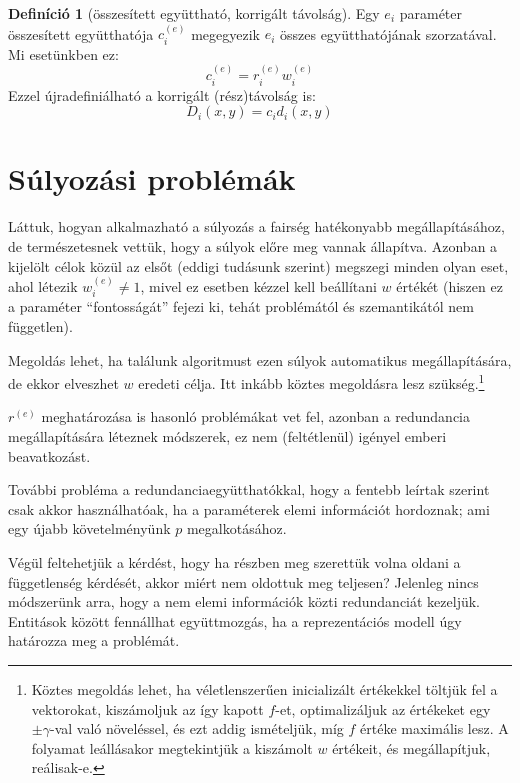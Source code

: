\documentclass[twocolumn]{article}
\theoremstyle{definition}
\newtheorem{definition}{Definíció}[section]
\newcommand{\ent}[2]{ {#1}^{(#2)} }
\begin{document}
    \begin{definition}[összesített együttható, korrigált távolság]
        Egy $e_i$ paraméter összesített együtthatója $\ent c e _i$ megegyezik $e_i$ összes együtthatójának szorzatával. Mi esetünkben ez:
        \begin{equation}
            \ent c e _i = \ent r e _i \ent w e _i
        \end{equation}
        Ezzel újradefiniálható a korrigált (rész)távolság is:
        \begin{equation}
            D_i(x, y) = c_i d_i(x, y)
        \end{equation}
    \end{definition}

\section{Súlyozási problémák}
    Láttuk, hogyan alkalmazható a súlyozás a fairség hatékonyabb megállapításához, de természetesnek vettük, hogy a súlyok előre meg vannak állapítva. Azonban a kijelölt célok közül az elsőt (eddigi tudásunk szerint) megszegi minden olyan eset, ahol létezik $\ent w e _i \neq 1$, mivel ez esetben kézzel kell beállítani $w$ értékét (hiszen ez a paraméter \enquote{fontosságát} fejezi ki, tehát problémától és szemantikától nem független).
    
    Megoldás lehet, ha találunk algoritmust ezen súlyok automatikus megállapítására, de ekkor elveszhet $w$ eredeti célja. Itt inkább köztes megoldásra lesz szükség.\footnote{Köztes megoldás lehet, ha véletlenszerűen inicializált értékekkel töltjük fel a vektorokat, kiszámoljuk az így kapott $f$-et, optimalizáljuk az értékeket egy $\pm \gamma$-val való növeléssel, és ezt addig ismételjük, míg $f$ értéke maximális lesz. A folyamat leállásakor megtekintjük a kiszámolt $w$ értékeit, és megállapítjuk, reálisak-e.}
    
    $\ent r e$ meghatározása is hasonló problémákat vet fel, azonban a redundancia megállapítására léteznek módszerek, ez nem (feltétlenül) igényel emberi beavatkozást.
    
    További probléma a redundanciaegyütthatókkal, hogy a fentebb leírtak szerint csak akkor használhatóak, ha a paraméterek elemi információt hordoznak; ami egy újabb követelményünk $p$ megalkotásához.
    
    Végül feltehetjük a kérdést, hogy ha részben meg szerettük volna oldani a függetlenség kérdését, akkor miért nem oldottuk meg teljesen? Jelenleg nincs módszerünk arra, hogy a nem elemi információk közti redundanciát kezeljük. Entitások között fennállhat együttmozgás, ha a reprezentációs modell úgy határozza meg a problémát.
    
\end{document}
